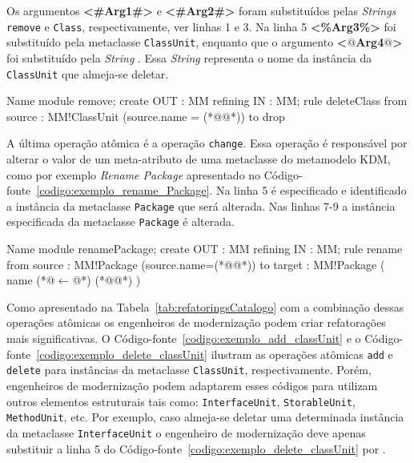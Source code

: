 Os argumentos \textbf{<\#Arg1\#>} e \textbf{<\#Arg2\#>} foram substituídos pelas \textit{Strings} \texttt{remove} e \texttt{Class}, respectivamente, ver linhas 1 e 3. Na linha 5 \textbf{<\%Arg3\%>} foi substituído pela metaclasse \texttt{ClassUnit}, enquanto que o argumento \textbf{<$@$Arg4$@$>} foi substituído pela \textit{String} \texttt{}. Essa \textit{String} representa o nome da instância da \texttt{ClassUnit} que almeja-se deletar.


\begin{codigo}[caption={[ATL para realizar a operação atômica \textit{delete} \texttt{ClassUnit}.] ATL para realizar a operação atômica \textit{delete} \texttt{ClassUnit}.},escapeinside={(*@}{@*)}, basicstyle=\footnotesize, label={codigo:exemplo_delete_classUnit}, language=ATL]{Name}
module remove;
create OUT : MM refining IN : MM;
rule deleteClass {
  from
      source : MM!ClassUnit (source.name = (*@@*))
  to
      drop
}
\end{codigo}

A última operação atômica é a operação \texttt{change}. Essa operação é responsável por alterar o valor de um meta-atributo de uma metaclasse do metamodelo KDM, como por exemplo \textit{Rename Package} apresentado no Código-fonte~\ref{codigo:exemplo_rename_Package}. Na linha 5 é especificado e identificado a instância da metaclasse \texttt{Package} que será alterada. Nas linhas 7-9 a instância especificada da metaclasse \texttt{Package} é alterada.

\begin{codigo}[caption={[ATL para realizar a operação atômica \textit{change} \texttt{ClassUnit}.] ATL para realizar a operação atômica \textit{change} \texttt{ClassUnit}.},escapeinside={(*@}{@*)}, basicstyle=\footnotesize, label={codigo:exemplo_rename_Package}, language=ATL]{Name}
module renamePackage;
create OUT : MM refining IN : MM;
rule rename {
	from
		source : MM!Package (source.name=(*@@*))
	to 
		target : MM!Package (
			name (*@$\leftarrow$@*) (*@@*)
		)
}
\end{codigo}


Como apresentado na Tabela~\ref{tab:refatoringsCatalogo} com a combinação dessas operações atômicas os engenheiros de modernização podem criar refatorações mais significativas. O Código-fonte~\ref{codigo:exemplo_add_classUnit} e o Código-fonte~\ref{codigo:exemplo_delete_classUnit} ilustram as operações atômicas \texttt{add} e \texttt{delete} para instâncias da metaclasse \texttt{ClassUnit}, respectivamente. Porém, engenheiros de modernização podem adaptarem esses códigos para utilizam outros elementos estruturais tais como: \texttt{InterfaceUnit}, \texttt{StorableUnit}, \texttt{MethodUnit}, etc. Por exemplo, caso almeja-se deletar uma determinada instância da metaclasse \texttt{InterfaceUnit} o engenheiro de modernização deve apenas substituir a linha 5 do Código-fonte~\ref{codigo:exemplo_delete_classUnit} por . 

